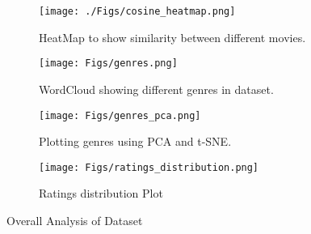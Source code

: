 \documentclass[a4paper]{article}
\theoremstyle{plain}
\theoremstyle{definition}
\begin{document}
 \begin{figure}[h]
    \centering
    \begin{subfigure}{0.5\textwidth}
        \centering
        \texttt{[image: ./Figs/cosine\_heatmap.png]}
        \caption{HeatMap to show similarity between different movies.}
    \end{subfigure}%
    \begin{subfigure}{0.5\textwidth}
        \centering
        \texttt{[image: Figs/genres.png]}
        \caption{WordCloud showing different genres in dataset.}
    \end{subfigure}

    \begin{subfigure}{\textwidth} %
        \centering
        \texttt{[image: Figs/genres\_pca.png]} %
        \caption{Plotting genres using PCA and t-SNE.}
    \end{subfigure}

     \begin{subfigure}{\textwidth} %
        \centering
        \texttt{[image: Figs/ratings\_distribution.png]}
        \caption{Ratings distribution Plot}
    \end{subfigure}
    
    \caption{Overall Analysis of Dataset}
\end{figure}


    
\end{document}
